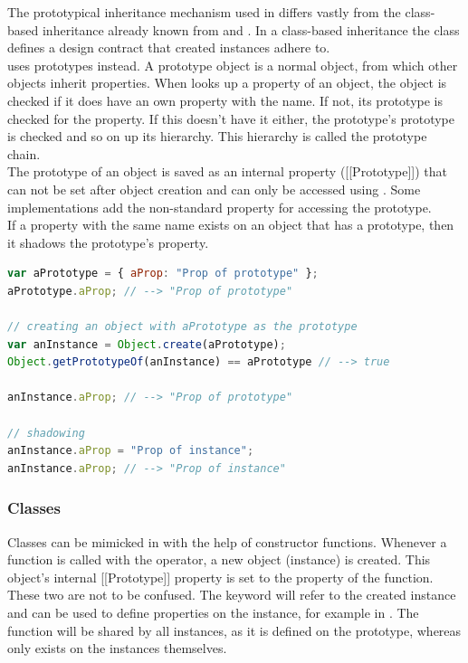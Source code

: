 The prototypical inheritance mechanism used in  differs vastly from the class-based inheritance already known from  and . In a class-based inheritance the class defines a design contract that created instances adhere to.\\
 uses prototypes instead. A prototype object is a normal  object, from which other objects inherit properties. When  looks up a property of an object, the object is checked if it does have an own property with the name. If not, its prototype is checked for the property. If this doesn't have it either, the prototype's prototype is checked and so on up its hierarchy. This hierarchy is called the prototype chain.\\
The prototype of an object is saved as an internal property ([[Prototype]]) that can not be set after object creation and can only be accessed using \linebreak{}. Some implementations add the non-standard \linebreak{} property for accessing the prototype.\\
If a property with the same name exists on an object that has a prototype, then it shadows the prototype's property.

\SingleSpacing
\begin{lstlisting}[language=JavaScript, caption=Prototypes]
var aPrototype = { aProp: "Prop of prototype" };
aPrototype.aProp; // --> "Prop of prototype"

// creating an object with aPrototype as the prototype
var anInstance = Object.create(aPrototype);
Object.getPrototypeOf(anInstance) == aPrototype // --> true

anInstance.aProp; // --> "Prop of prototype"

// shadowing
anInstance.aProp = "Prop of instance";
anInstance.aProp; // --> "Prop of instance"
\end{lstlisting}
\OnehalfSpacing

\subsubsection{Classes}
\label{sec:JSClasses}

Classes can be mimicked in  with the help of constructor functions. Whenever a function is called with the  operator, a new object (instance) is created. This object's internal [[Prototype]] property is set to the  property of the function. These two are not to be confused. The  keyword will refer to the created instance and can be used to define properties on the instance, for example  in . The  function will be shared by all instances, as it is defined on the prototype, whereas  only exists on the instances themselves.

